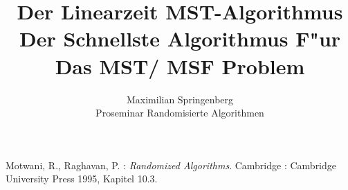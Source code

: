 \documentclass[a4paper,12pt,times,german]{cls/summary}
\title{Der Linearzeit MST-Algorithmus\\
       \LARGE Der Schnellste Algorithmus F"ur Das MST/ MSF Problem}
\author{Maximilian Springenberg\\
        \small Proseminar Randomisierte Algorithmen}
\date{}
\begin{document}
\maketitle







\begin{thebibliography}{}
\footnotesize
{} 
    Motwani, R., Raghavan, P. :
    \textit{Randomized Algorithms}. Cambridge :
    Cambridge University Press 1995, Kapitel 10.3.
\end{thebibliography}

%
\end{document}
